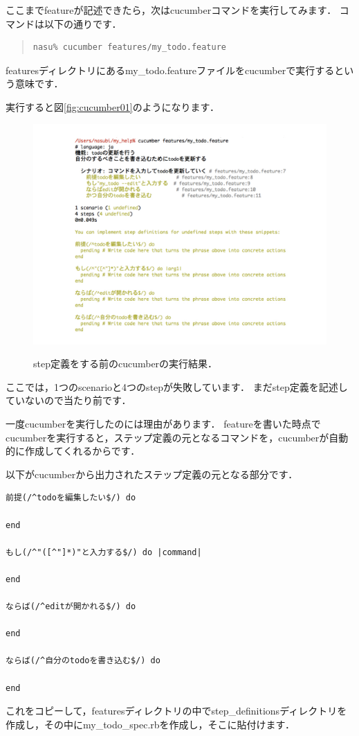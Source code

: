 ここまでfeatureが記述できたら，次はcucumberコマンドを実行してみます．
コマンドは以下の通りです．
\begin{quote}\begin{verbatim}
nasu% cucumber features/my_todo.feature
\end{verbatim}\end{quote}
featuresディレクトリにあるmy\_todo.featureファイルをcucumberで実行するという意味です．

実行すると図\ref{fig:cucumber01}のようになります．

\begin{figure}[htbp]\begin{center}
\includegraphics[width=12cm,bb= 0 0 937 753]{../figs/./my_help_nasu.003.jpeg}
\caption{step定義をする前のcucumberの実行結果．}
\label{fig:cucumber01}
\label{default}\end{center}\end{figure}
ここでは，1つのscenarioと4つのstepが失敗しています．
まだstep定義を記述していないので当たり前です．

一度cucumberを実行したのには理由があります．
featureを書いた時点でcucumberを実行すると，ステップ定義の元となるコマンドを，cucumberが自動的に作成してくれるからです．

以下がcucumberから出力されたステップ定義の元となる部分です．
\begin{lstlisting}[style=customCsh,basicstyle={\scriptsize\ttfamily}]
前提(/^todoを編集したい$/) do

end

もし(/^"([^"]*)"と入力する$/) do |command|

end

ならば(/^editが開かれる$/) do
  
end

ならば(/^自分のtodoを書き込む$/) do

end
\end{lstlisting}
これをコピーして，featuresディレクトリの中でstep\_definitionsディレクトリを作成し，その中にmy\_todo\_spec.rbを作成し，そこに貼付けます．

